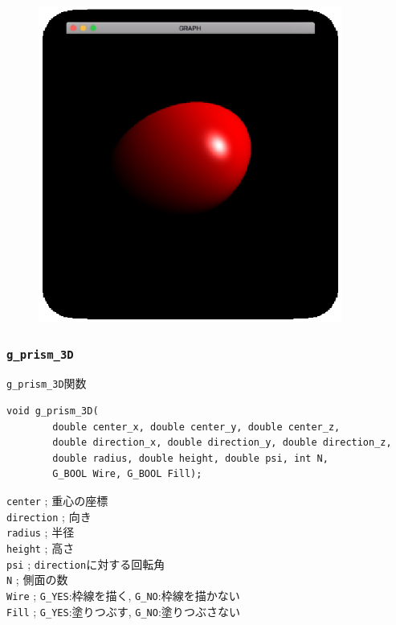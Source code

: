 \documentclass[platex,a4paper,12pt]{jsarticle}%
\begin{document}
\begin{figure}[htb]
\centering
\includegraphics[width=100mm]{Canvas_g_ellipse_SDL.eps}
\end{figure}




\clearpage
\subsubsection{\texttt{g\_prism\_3D}}

\begin{itembox}[l]{\texttt{g\_prism\_3D}関数}
\begin{verbatim}
void g_prism_3D(
        double center_x, double center_y, double center_z,
        double direction_x, double direction_y, double direction_z,
        double radius, double height, double psi, int N,
        G_BOOL Wire, G_BOOL Fill);   
\end{verbatim}
\verb|center| ; 重心の座標\\
\verb|direction| ; 向き\\
\verb|radius| ; 半径\\
\verb|height| ; 高さ\\
\verb|psi| ; \verb|direction|に対する回転角\\
\verb|N| ; 側面の数\\
\verb|Wire| ; \verb|G_YES|:枠線を描く, \verb|G_NO|:枠線を描かない \\
\verb|Fill| ; \verb|G_YES|:塗りつぶす, \verb|G_NO|:塗りつぶさない
\end{itembox}
\end{document}
